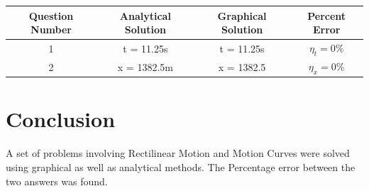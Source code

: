 \documentclass[11pt]{article}
\begin{document}
\begin{tabular}{|c|c|c|c|}
	\hline
	Question Number & Analytical Solution & Graphical Solution & Percent Error \\
	\hline
	1 	& t = 11.25s  & t = 11.25s & $\eta_t = 0\%$\\
	\hline
	2 	& x = 1382.5m  & x = 1382.5 & $\eta_x = 0\%$ \\
	\hline
\end{tabular}


\section{Conclusion}
A set of problems involving Rectilinear Motion and Motion Curves were solved using graphical as well as analytical methods. The Percentage error between the two answers was found.
\end{document}
